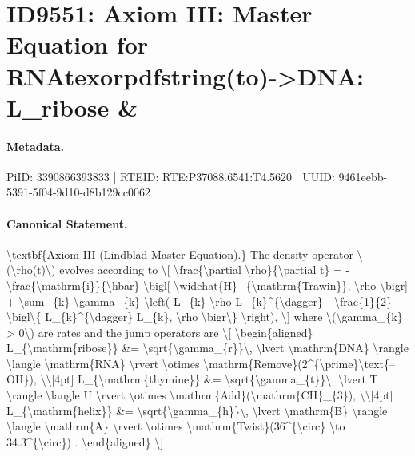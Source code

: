\section*{ID9551: Axiom III: Master Equation for RNAtexorpdfstring(to)->DNA: L\_ribose \&}
\paragraph{Metadata.}
PiID: 3390866393833 | RTEID: RTE:P37088.6541:T4.5620 | UUID: 9461eebb-5391-5f04-9d10-d8b129cc0062

\paragraph{Canonical Statement.}
\textbackslash{}textbf\{Axiom III (Lindblad Master Equation).\} The density operator \textbackslash{}(\textbackslash{}rho(t)\textbackslash{}) evolves according to \textbackslash{}[ \textbackslash{}frac\{\textbackslash{}partial \textbackslash{}rho\}\{\textbackslash{}partial t\} = - \textbackslash{}frac\{\textbackslash{}mathrm\{i\}\}\{\textbackslash{}hbar\} \textbackslash{}bigl[ \textbackslash{}widehat\{H\}\_\{\textbackslash{}mathrm\{Trawin\}\}, \textbackslash{}rho \textbackslash{}bigr] + \textbackslash{}sum\_\{k\} \textbackslash{}gamma\_\{k\} \textbackslash{}left( L\_\{k\} \textbackslash{}rho L\_\{k\}\textasciicircum{}\{\textbackslash{}dagger\} - \textbackslash{}frac\{1\}\{2\} \textbackslash{}bigl\textbackslash{}\{ L\_\{k\}\textasciicircum{}\{\textbackslash{}dagger\} L\_\{k\}, \textbackslash{}rho \textbackslash{}bigr\textbackslash{}\} \textbackslash{}right), \textbackslash{}] where \textbackslash{}(\textbackslash{}gamma\_\{k\} > 0\textbackslash{}) are rates and the jump operators are \textbackslash{}[ \textbackslash{}begin\{aligned\} L\_\{\textbackslash{}mathrm\{ribose\}\} \&= \textbackslash{}sqrt\{\textbackslash{}gamma\_\{r\}\}\textbackslash{}, \textbackslash{}lvert \textbackslash{}mathrm\{DNA\} \textbackslash{}rangle \textbackslash{}langle \textbackslash{}mathrm\{RNA\} \textbackslash{}rvert \textbackslash{}otimes \textbackslash{}mathrm\{Remove\}(2\textasciicircum{}\{\textbackslash{}prime\}\textbackslash{}text\{--OH\}), \textbackslash{}\textbackslash{}[4pt] L\_\{\textbackslash{}mathrm\{thymine\}\} \&= \textbackslash{}sqrt\{\textbackslash{}gamma\_\{t\}\}\textbackslash{}, \textbackslash{}lvert T \textbackslash{}rangle \textbackslash{}langle U \textbackslash{}rvert \textbackslash{}otimes \textbackslash{}mathrm\{Add\}(\textbackslash{}mathrm\{CH\}\_\{3\}), \textbackslash{}\textbackslash{}[4pt] L\_\{\textbackslash{}mathrm\{helix\}\} \&= \textbackslash{}sqrt\{\textbackslash{}gamma\_\{h\}\}\textbackslash{}, \textbackslash{}lvert \textbackslash{}mathrm\{B\} \textbackslash{}rangle \textbackslash{}langle \textbackslash{}mathrm\{A\} \textbackslash{}rvert \textbackslash{}otimes \textbackslash{}mathrm\{Twist\}(36\textasciicircum{}\{\textbackslash{}circ\} \textbackslash{}to 34.3\textasciicircum{}\{\textbackslash{}circ\}) . \textbackslash{}end\{aligned\} \textbackslash{}]

